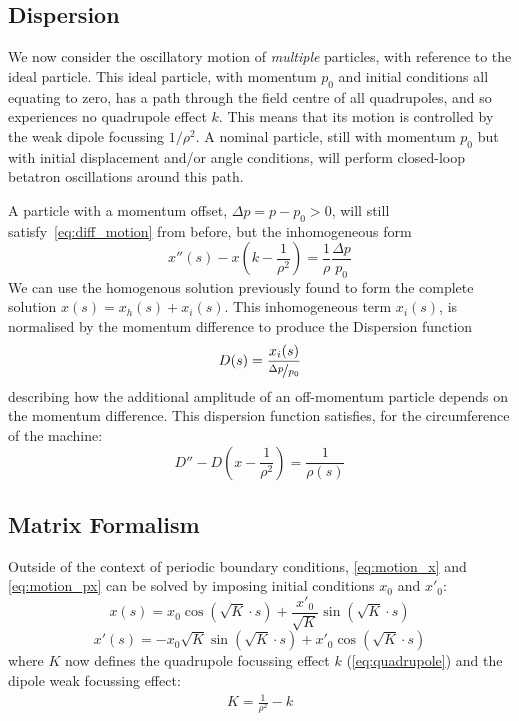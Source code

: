 \documentclass[11pt]{report}
\begin{document}
\subsection{Dispersion}\label{sec:transdisp}

We now consider the oscillatory motion of \textit{multiple} particles, with reference to the ideal particle. This ideal particle, with momentum $p_0$ and initial conditions all equating to zero, has a path through the field centre of all quadrupoles, and so experiences no quadrupole effect $k$. This means that its motion is controlled by the weak dipole focussing $1/\rho^2$. A nominal particle, still with momentum $p_0$ but with initial displacement and/or angle conditions, will perform closed-loop betatron oscillations around this path. 

A particle with a momentum offset, $\Delta p = p-p_0 > 0$, will still satisfy~\ref{eq:diff_motion} from before, but the inhomogeneous form
\begin{equation}
  x''(s)-x\left(k-\frac 1{\rho^2}\right)=\frac 1\rho\frac{\Delta p}{p_0}
\end{equation}
We can use the homogenous solution previously found to form the complete solution $x(s)=x_h(s)+x_i(s)$. This inhomogeneous term $x_i(s)$, is normalised by the momentum difference to produce the Dispersion function
\begin{equation}
  D(s)=\frac{x_i(s)}{\nicefrac{\Delta p}{p_0}}
  \label{eq:dispersion}
\end{equation} describing how the additional amplitude of an off-momentum particle depends on the momentum difference. 
This dispersion function satisfies, for the circumference of the machine:
\begin{equation}
  D''-D\left(x-\frac1{\rho^2}\right)=\frac 1{\rho(s)}
\end{equation}

\subsection{Matrix Formalism}


Outside of the context of periodic boundary conditions, \autoref{eq:motion_x} and \autoref{eq:motion_px} can be solved by imposing initial conditions $x_0$ and $x'_0$:
\begin{equation}
  x(s)=x_0\cos\left(\sqrt{K}\cdot s\right)+\frac{x'_0}{\sqrt{K}}\sin\left(\sqrt{K}\cdot s\right)
\end{equation}
\begin{equation}
  x'(s)=-x_0\sqrt{K}\sin\left(\sqrt{K}\cdot s\right)+x'_0\cos\left(\sqrt{K}\cdot s\right)
\end{equation}
where $K$ now defines the quadrupole focussing effect $k$ (\autoref{eq:quadrupole}) and the dipole weak focussing effect:
\begin{eqnarray}
  K=\frac1{\rho^2}-k
\end{eqnarray}
\end{document}
